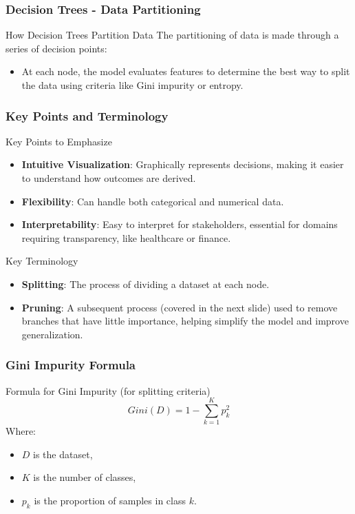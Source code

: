 \documentclass[aspectratio=169]{beamer}
\begin{document}
\begin{frame}[fragile]
    \frametitle{Decision Trees - Data Partitioning}
    \begin{block}{How Decision Trees Partition Data}
        The partitioning of data is made through a series of decision points:
        \begin{itemize}
            \item At each node, the model evaluates features to determine the best way to split the data using criteria like Gini impurity or entropy.
        \end{itemize}
    \end{block}
\end{frame}

\begin{frame}[fragile]
    \frametitle{Key Points and Terminology}
    \begin{block}{Key Points to Emphasize}
        \begin{itemize}
            \item \textbf{Intuitive Visualization}: Graphically represents decisions, making it easier to understand how outcomes are derived.
            \item \textbf{Flexibility}: Can handle both categorical and numerical data.
            \item \textbf{Interpretability}: Easy to interpret for stakeholders, essential for domains requiring transparency, like healthcare or finance.
        \end{itemize}
    \end{block}
    
    \begin{block}{Key Terminology}
        \begin{itemize}
            \item \textbf{Splitting}: The process of dividing a dataset at each node.
            \item \textbf{Pruning}: A subsequent process (covered in the next slide) used to remove branches that have little importance, helping simplify the model and improve generalization.
        \end{itemize}
    \end{block}
\end{frame}

\begin{frame}[fragile]
    \frametitle{Gini Impurity Formula}
    \begin{block}{Formula for Gini Impurity (for splitting criteria)}
        \begin{equation}
            Gini(D) = 1 - \sum_{k=1}^{K} p_k^2 
        \end{equation}
        Where:
        \begin{itemize}
            \item \( D \) is the dataset,
            \item \( K \) is the number of classes,
            \item \( p_k \) is the proportion of samples in class \( k \).
        \end{itemize}
    \end{block}
\end{frame}
\end{document}
